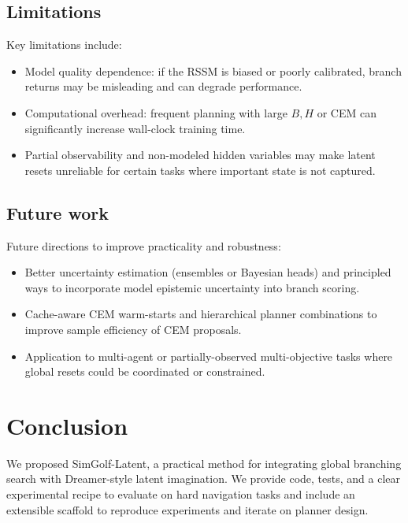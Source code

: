 \documentclass{article}
\begin{document}
\subsection{Limitations}
Key limitations include:
\begin{itemize}
\item Model quality dependence: if the RSSM is biased or poorly calibrated, branch
    returns may be misleading and can degrade performance.
\item Computational overhead: frequent planning with large \(B,H\) or CEM can
    significantly increase wall-clock training time.
\item Partial observability and non-modeled hidden variables may make latent
    resets unreliable for certain tasks where important state is not captured.
\end{itemize}

\subsection{Future work}
Future directions to improve practicality and robustness:
\begin{itemize}
\item Better uncertainty estimation (ensembles or Bayesian heads) and principled
    ways to incorporate model epistemic uncertainty into branch scoring.
\item Cache-aware CEM warm-starts and hierarchical planner combinations to
    improve sample efficiency of CEM proposals.
\item Application to multi-agent or partially-observed multi-objective tasks
    where global resets could be coordinated or constrained.
\end{itemize}

\section{Conclusion}
We proposed SimGolf-Latent, a practical method for integrating global branching
search with Dreamer-style latent imagination. We provide code, tests, and a
clear experimental recipe to evaluate on hard navigation tasks and include an
extensible scaffold to reproduce experiments and iterate on planner design.

\appendix
\end{document}
